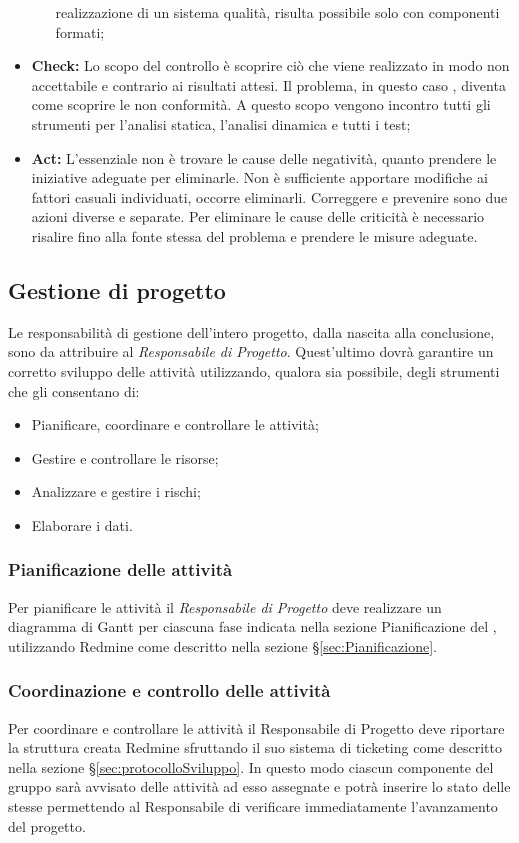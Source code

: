 \begin{itemize}
\begin{itemize}
  realizzazione di un sistema qualità, risulta possibile solo con componenti formati;
 \end{itemize}
  \item \textbf{Check:} 
  Lo scopo del controllo è scoprire ciò che viene realizzato in modo non accettabile e contrario ai risultati attesi. Il problema, in questo caso , diventa come scoprire le non conformità. A questo scopo vengono incontro tutti gli strumenti per l'analisi statica, l'analisi dinamica e tutti i test;
  \item \textbf{Act:}
  L’essenziale non è trovare le cause delle negatività, quanto prendere le iniziative adeguate per eliminarle. Non è sufficiente apportare modifiche ai fattori casuali individuati, occorre eliminarli. Correggere e prevenire sono due azioni diverse e
  separate. Per eliminare le cause delle criticità è necessario risalire fino alla fonte stessa del problema e prendere le misure adeguate. 
  
\end{itemize}

\subsection{Gestione di progetto}
Le responsabilità di gestione dell’intero progetto, dalla nascita alla conclusione, sono da
attribuire al \emph{Responsabile di Progetto}.
Quest’ultimo dovrà garantire un corretto sviluppo delle attività utilizzando, qualora sia possibile, degli strumenti che gli consentano di:
\begin{itemize}
\item Pianificare, coordinare e controllare le attività;
\item Gestire e controllare le risorse;
\item Analizzare e gestire i rischi;
\item Elaborare i dati.
\end{itemize}
\subsubsection{Pianificazione delle attività}
Per pianificare le attività il \emph{Responsabile di Progetto} deve realizzare un diagramma di
Gantt  per ciascuna fase indicata nella sezione Pianificazione del \href{run:../../Esterni/\fPianoDiProgetto}{\fEscapePianoDiProgetto} , utilizzando Redmine come descritto nella sezione \S\ref{sec:Pianificazione}.
\subsubsection{Coordinazione e controllo delle attività}
Per coordinare e controllare le attività il Responsabile di Progetto deve riportare la struttura creata Redmine sfruttando il suo sistema di ticketing
come descritto nella sezione \S\ref{sec:protocolloSviluppo}.
In questo modo ciascun componente del gruppo sarà avvisato delle attività ad esso assegnate e potrà inserire lo stato delle stesse permettendo al Responsabile di verificare immediatamente l’avanzamento del progetto.

